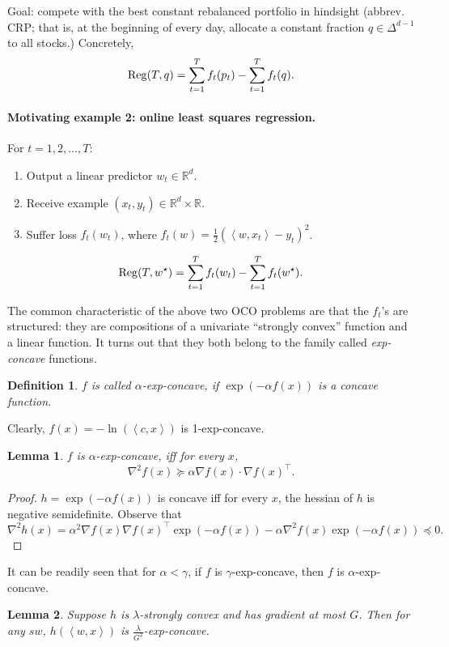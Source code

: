 \documentclass{article}
\newtheorem{lemma}{Lemma}
\newtheorem{definition}{Definition}
\DeclareMathOperator*{\Reg}{{\rm Reg}}
\newcommand{\RR}{\mathbb{R}} %
\newcommand{\inner}[2]{\left\langle #1,#2 \right\rangle}
\begin{document}
Goal: compete with the best constant rebalanced portfolio in hindsight (abbrev. CRP; that is, at the beginning of every day, allocate a constant fraction $q \in \Delta^{d-1}$ to all stocks.) Concretely,
\[ \Reg(T, q) = \sum_{t=1}^T f_t(p_t) - \sum_{t=1}^T f_t(q). \]


\paragraph{Motivating example 2: online least squares regression.}

For $t = 1,2,\ldots,T$:
\begin{enumerate}
\item Output a linear predictor $w_t \in \RR^d$.
\item Receive example $(x_t, y_t) \in \RR^d \times \RR$.
\item Suffer loss $f_t(w_t)$, where $f_t(w) = \frac12(\inner{w}{x_t} - y_t)^2$.
\end{enumerate}

\[ \Reg(T, w^\star) = \sum_{t=1}^T f_t(w_t) - \sum_{t=1}^T f_t(w^\star). \]

The common characteristic of the above two OCO problems are that the $f_t$'s are structured:
they are compositions of a univariate ``strongly convex'' function and a linear function. It turns out that they both belong to the family called {\em exp-concave} functions.

\begin{definition}
$f$ is called $\alpha$-exp-concave, if $\exp(-\alpha f(x))$ is a concave function.
\end{definition}

Clearly, $f(x) = -\ln(\inner{c}{x})$ is 1-exp-concave.

\begin{lemma}
$f$ is $\alpha$-exp-concave, iff for every $x$,
\[ \nabla^2 f(x) \succeq \alpha \nabla f(x) \cdot \nabla f(x)^\top. \]
\end{lemma}
\begin{proof}
$h = \exp(-\alpha f(x))$ is concave iff for every $x$, the hessian of $h$ is negative
semidefinite.
Observe that
\[ \nabla^2 h(x) = \alpha^2 \nabla f(x) \nabla f(x)^\top \exp(-\alpha f(x)) - \alpha \nabla^2 f(x) \exp(-\alpha f(x)) \preceq 0. \]
\end{proof}

It can be readily seen that for $\alpha < \gamma$, if $f$ is $\gamma$-exp-concave, then $f$ is $\alpha$-exp-concave.

\begin{lemma}
Suppose $h$ is $\lambda$-strongly convex and has gradient at most $G$. Then for any $sw$, $h(\inner{w}{x})$ is $\frac{\lambda}{G^2}$-exp-concave.
\end{lemma}
\end{document}
